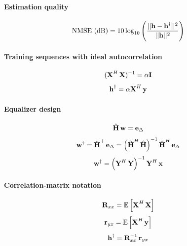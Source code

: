 \paragraph{Estimation quality}
\begin{equation}
\textrm{NMSE (dB)} = 10 \log_{10} \left( \frac{||{\textbf h}-{\textbf h}^\dag||^2}{||{\textbf h}||^2} \right)
\label{eq:nmse_dB}
\end{equation}

\paragraph{Training sequences with ideal autocorrelation}
\begin{equation}
({\textbf X}^H \, {\textbf X})^{-1}=\alpha {\textbf I}
\label{eq:desiredAutocorrelationProperty}
\end{equation}
\begin{equation}
{{\textbf h}}^\dag = \alpha {\textbf X}^{H} \,  {\textbf y}
\label{eq:ls_simplified_solution}
\end{equation}

\paragraph{Equalizer design}
\begin{equation}
\hat {{\textbf H}} \, {\textbf w} = {\textbf e}_{\Delta}
\label{eq:ls_equalizer}
\end{equation}
\begin{equation}
{{\textbf w}}^\dag = \hat {{\textbf H}}^+ \,  {\textbf e}_{\Delta} = \left(\hat {{\textbf H}}^H \, \hat {{\textbf H}} \right)^{-1}  \hat {{\textbf H}}^H \,  {\textbf e}_{\Delta}
\label{eq:ls_solution2}
\end{equation}
\begin{equation}
{{\textbf w}^\dag} = \left( {\textbf Y}^H \, {\textbf Y} \right)^{-1}  {\textbf Y}^H \,  {\textbf x}
\label{eq:equalizer_direct_solution}
\end{equation}

\paragraph{Correlation-matrix notation}
\begin{equation}
{\textbf R}_{xx} = \mathbb{E} \left[ {\textbf X}^H \, {\textbf X} \right]
\label{eq:correlationMatrixRx}
\end{equation}
\begin{equation}
{\textbf r}_{yx} = \mathbb{E} \left[ {\textbf X}^H \, {\textbf y} \right]
\label{eq:crosscorrelationRxy}
\end{equation}
\begin{equation}
{{\textbf h}}^\dag = {\textbf R}_{xx}^{-1}  \, {\textbf r}_{yx}
\label{eq:ls_solution_correlationNotation}
\end{equation}


